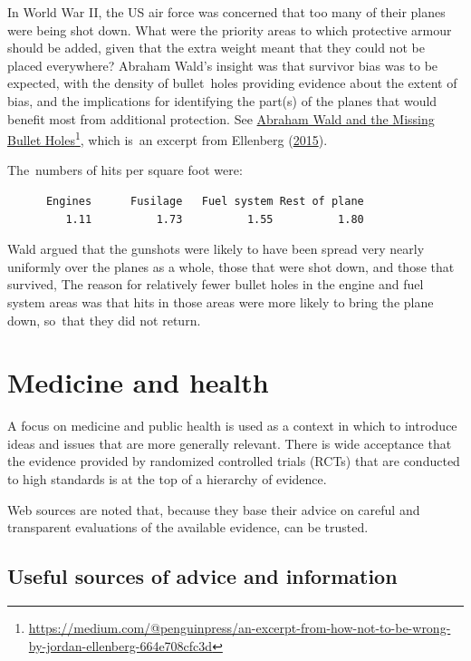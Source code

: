 \documentclass[
  10pt,
  b5paper]{book}
\begin{document}
In World War II, the US air force was concerned that too many
of their planes were being shot down. What were the priority
areas to which protective armour should be added, given that
the extra weight meant that they could not be placed everywhere?
Abraham Wald's insight was that survivor bias was to be
expected, with the density of bullet~holes providing evidence
about the extent of bias, and the implications for identifying
the part(s) of the planes that would benefit most from
additional protection. See \href{https://medium.com/@penguinpress/an-excerpt-from-how-not-to-be-wrong-by-jordan-ellenberg-664e708cfc3d}{Abraham Wald and the Missing Bullet Holes}\footnote{\url{https://medium.com/@penguinpress/an-excerpt-from-how-not-to-be-wrong-by-jordan-ellenberg-664e708cfc3d}},
which is~an excerpt from Ellenberg (\protect\hyperlink{ref-ellenberg_2015}{2015}).

The~numbers of hits per square foot were:

\begin{verbatim}
      Engines      Fusilage   Fuel system Rest of plane 
         1.11          1.73          1.55          1.80 
\end{verbatim}

Wald argued that the gunshots were likely to have been spread
very nearly uniformly over the planes as a whole, those that
were shot down, and those that survived, The reason for relatively
fewer bullet holes in the engine and fuel system areas was that
hits in those areas were more likely to bring the plane down,
so~that they did not return.

\hypertarget{medicine-and-health}{%
\chapter{Medicine and health}\label{medicine-and-health}}

A focus on medicine and public health is used as a context in which to
introduce ideas and issues that are more generally relevant. There is
wide acceptance that the evidence provided by randomized controlled
trials (RCTs) that are conducted to high standards is at the top of a
hierarchy of evidence.

Web sources are noted that, because they base their advice on careful
and transparent evaluations of the available evidence, can be trusted.

\hypertarget{useful-sources-of-advice-and-information}{%
\section{Useful sources of advice and information}\label{useful-sources-of-advice-and-information}}
\end{document}
